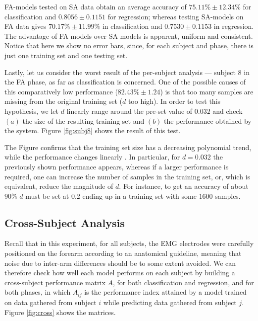 \documentclass[10pt]{bmc_article}
\def\texttt{[image: ]}
\newenvironment{bmcformat}{\begin{raggedright}\baselineskip20pt\sloppy\setboolean{publ}{false}}{\end{raggedright}\baselineskip20pt\sloppy}
\begin{document}
\begin{bmcformat}
FA-models tested on SA data obtain an average accuracy of $75.11\% \pm 12.34\%$
for classification and $0.8056 \pm 0.1151$ for regression;
whereas testing SA-models on FA data gives $70.17\% \pm 11.99\%$ in classification
and $0.7530 \pm 0.1153$ in regression. The advantage of FA models over SA models
is apparent, uniform and consistent. Notice that here we show no error bars,
since, for each subject and phase, there is just one training set and one testing set.

Lastly, let us consider the worst result of the per-subject analysis
--- subject $8$ in the FA phase, as far as classification is concerned.
One of the possible causes of this comparatively low performance
($82.43\% \pm 1.24$) is that too many samples are missing from the
original training set ($d$ too high). In order to test this hypothesis,
we let $d$ linearly range around the pre-set value of $0.032$ and check
$(a)$ the size of the resulting training set and $(b)$ the performance
obtained by the system. Figure \ref{fig:subj8} shows the result of
this test.


The Figure confirms that the training set size has a decreasing
polynomial trend, while the performance changes linearly
\cite{2008.BioCyb}. In
particular, for $d=0.032$ the previously shown performance appears,
whereas if a larger performance is required, one can increase the
number of samples in the training set, or, which is equivalent, reduce
the magnitude of $d$. For instance, to get an accuracy of about $90\%$
$d$ must be set at $0.2$ ending up in a training set with some $1600$
samples.

\subsection*{Cross-Subject Analysis}

Recall that in this experiment, for all subjects, the EMG electrodes
were carefully positioned on the forearm according to an anatomical
guideline, meaning that noise due to inter-arm differences should be
to some extent avoided. We can therefore check how well each model
performs on each subject by building a cross-subject performance
matrix $A$, for both classification and regression, and for both phases,
in which $A_{ij}$ is the performance index attained by a model trained
on data gathered from subject $i$ while predicting data gathered from
subject $j$.  Figure \ref{fig:cross} shows the matrices.


\end{bmcformat}
\end{document}
